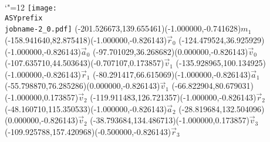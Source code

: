 \setlength{\unitlength}{1pt}
\makeatletter%
\let\ASYencoding\f@encoding%
\let\ASYfamily\f@family%
\let\ASYseries\f@series%
\let\ASYshape\f@shape%
\makeatother%
{\catcode`"=12%
\texttt{[image: \\ASYprefix\\jobname-2\_0.pdf]}%
}%
\color{ASYcolor}
\fontsize{12.000000}{14.400000}\selectfont
\usefont{\ASYencoding}{\ASYfamily}{\ASYseries}{\ASYshape}%
\ASYalign(-201.526673,139.655461)(-1.000000,-0.741628){$m_1$}%
\color{ASYcolor}
\fontsize{12.000000}{14.400000}\selectfont
\ASYalign(-158.941640,82.875418)(-1.000000,-0.826143){$\vec{r}_0$}%
\color{ASYcolor}
\fontsize{12.000000}{14.400000}\selectfont
\ASYalign(-124.479524,36.925929)(-1.000000,-0.826143){$\vec{a}_0$}%
\color{ASYcolor}
\fontsize{12.000000}{14.400000}\selectfont
\ASYalign(-97.701029,36.268682)(0.000000,-0.826143){$\vec{v}_0$}%
\color{ASYcolor}
\fontsize{12.000000}{14.400000}\selectfont
\ASYalign(-107.635710,44.503643)(-0.707107,0.173857){$\vec{v}_1$}%
\color{ASYcolor}
\fontsize{12.000000}{14.400000}\selectfont
\ASYalign(-135.928965,100.134925)(-1.000000,-0.826143){$\vec{r}_1$}%
\color{ASYcolor}
\fontsize{12.000000}{14.400000}\selectfont
\ASYalign(-80.291417,66.615069)(-1.000000,-0.826143){$\vec{a}_1$}%
\color{ASYcolor}
\fontsize{12.000000}{14.400000}\selectfont
\ASYalign(-55.798870,76.285286)(0.000000,-0.826143){$\vec{v}_1$}%
\color{ASYcolor}
\fontsize{12.000000}{14.400000}\selectfont
\ASYalign(-66.822904,80.679031)(-1.000000,0.173857){$\vec{v}_2$}%
\color{ASYcolor}
\fontsize{12.000000}{14.400000}\selectfont
\ASYalign(-119.911483,126.721357)(-1.000000,-0.826143){$\vec{r}_2$}%
\color{ASYcolor}
\fontsize{12.000000}{14.400000}\selectfont
\ASYalign(-48.160710,115.350533)(-1.000000,-0.826143){$\vec{a}_2$}%
\color{ASYcolor}
\fontsize{12.000000}{14.400000}\selectfont
\ASYalign(-28.819684,132.504096)(0.000000,-0.826143){$\vec{v}_2$}%
\color{ASYcolor}
\fontsize{12.000000}{14.400000}\selectfont
\ASYalign(-38.793684,134.486713)(-1.000000,0.173857){$\vec{v}_3$}%
\color{ASYcolor}
\fontsize{12.000000}{14.400000}\selectfont
\ASYalign(-109.925788,157.420968)(-0.500000,-0.826143){$\vec{r}_3$}%
